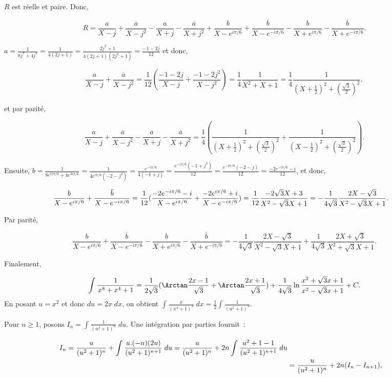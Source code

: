 {{$R$ est réelle et paire. Donc,

$$R=\frac{a}{X-j}+\frac{\overline{a}}{X-j^2}-\frac{a}{X+j}-\frac{\overline{a}}{X+j^2}+\frac{b}{X-e^{i\pi/6}}
+\frac{\overline{b}}{X-e^{-i\pi/6}}-\frac{b}{X+e^{i\pi/6}}-\frac{\overline{b}}{X+e^{-i\pi/6}}.$$

$a=\frac{1}{8j^7+4j^3}=\frac{1}{4(2j+1)}=\frac{2j^2+1}{4(2j+1)(2j^2+1)}=\frac{-1-2j}{12}$ et donc,

$$\frac{a}{X-j}+\frac{\overline{a}}{X-j^2}=\frac{1}{12}(\frac{-1-2j}{X-j}+\frac{-1-2j^2}{X-j^2})
=\frac{1}{4}\frac{1}{X^2+X+1}=\frac{1}{4}\frac{1}{(X+\frac{1}{2})^2+(\frac{\sqrt{3}}{2})^2},$$

 et par parité,
 
$$\frac{a}{X-j}+\frac{\overline{a}}{X-j^2}-\frac{a}{X+j}-\frac{\overline{a}}{X+j^2}=
\frac{1}{4}(\frac{1}{(X+\frac{1}{2})^2+(\frac{\sqrt{3}}{2})^2}+\frac{1}{(X-\frac{1}{2})^2+(\frac{\sqrt{3}}{2})^2}).$$

Ensuite, $b=\frac{1}{8e^{7i\pi/6}+4e^{3i\pi/6}}=\frac{1}{4e^{i\pi/6}(-2-j^2)}=\frac{e^{-i\pi/6}}{4(-1+j)}
=\frac{e^{-i\pi/6}(-1+j^2)}{12}=\frac{e^{-i\pi/6}(-2-j)}{12}=\frac{-2e^{-i\pi/6}-i}{12}$, et donc,

\begin{align*}\ensuremath
\frac{b}{X-e^{i\pi/6}}
+\frac{\overline{b}}{X-e^{-i\pi/6}}&=\frac{1}{12}(\frac{-2e^{-i\pi/6}-i}{X-e^{i\pi/6}}+\frac{-2e^{i\pi/6}+i}{X-e^{-i\pi/6}})=\frac{1}{12}\frac{-2\sqrt{3}X+3}{X^2-\sqrt{3}X+1}=-\frac{1}{4\sqrt{3}}\frac{2X-\sqrt{3}}{X^2-\sqrt{3}X+1}.
\end{align*}

Par parité,

$$\frac{b}{X-e^{i\pi/6}}
+\frac{\overline{b}}{X-e^{-i\pi/6}}-\frac{b}{X+e^{i\pi/6}}-\frac{\overline{b}}{X+e^{-i\pi/6}}=
-\frac{1}{4\sqrt{3}}\frac{2X-\sqrt{3}}{X^2-\sqrt{3}X+1}+\frac{1}{4\sqrt{3}}\frac{2X+\sqrt{3}}{X^2+\sqrt{3}X+1}.$$

Finalement,

$$\int_{}^{}\frac{1}{x^8+x^4+1}=\frac{1}{2\sqrt{3}}(\Arctan\frac{2x-1}{\sqrt{3}}+\Arctan\frac{2x+1}{\sqrt{3}})+\frac{1}{4\sqrt{3}}\ln\frac{x^2+\sqrt{3}x+1}{x^2-\sqrt{3}x+1}+C.$$
En posant $u=x^2$ et donc $du=2x\;dx$, on obtient $\int_{}^{}\frac{x}{(x^4+1)^3}\;dx=\frac{1}{2}\int_{}^{}\frac{1}{(u^2+1)^3}$.

Pour $n\geq1$, posons $I_n=\int_{}^{}\frac{1}{(u^2+1)^n}\;du$. Une intégration par parties fournit~:

\begin{align*}\ensuremath
I_n=\frac{u}{(u^2+1)^n}+\int_{}^{}\frac{u.(-n)(2u)}{(u^2+1)^{n+1}}\;du=\frac{u}{(u^2+1)^n}+2n\int_{}^{}\frac{u^2+1-1}{(u^2+1)^{n+1}}\;du\\
 &=\frac{u}{(u^2+1)^n}+2n(I_n-I_{n+1}),
\end{align*}

}}

